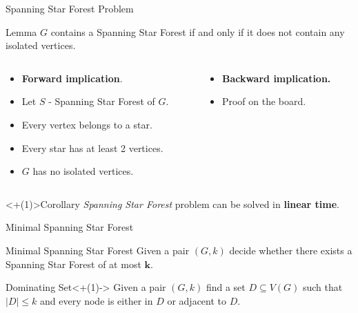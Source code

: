 \documentclass{beamer}
\begin{document}
\begin{frame}[t]{Spanning Star Forest Problem}
	\begin{block}{Lemma }
		$G$ contains a Spanning Star Forest if and only if it does not contain any isolated vertices.
	\end{block}
	
	\setlength{\leftmargini}{2pt}
	\begin{columns}[t]
		\begin{column}{0.5\textwidth}
			\begin{itemize}[<+(1)->]
				\item[] \textbf{Forward implication}.
				\item[] Let $S$ - Spanning Star Forest of $G$.
				\item[] Every vertex belongs to a star.
				\item[] Every star has at least 2 vertices.
				\item[] $G$ has no isolated vertices.
			\end{itemize}
		\end{column}
		\begin{column}{0.5\textwidth}
			\begin{itemize}[<+(1)->]
				\item[] \textbf{Backward implication.}
				\item[] Proof on the board.
			\end{itemize}
		\end{column}
	\end{columns}
	
	\vfill
	
	\begin{block}<+(1)>{Corollary}
		\emph{Spanning Star Forest} problem can be solved in \textbf{linear time}.
	\end{block}
	
\end{frame}

\begin{frame}[t]{Minimal Spanning Star Forest}

\begin{block}{Minimal Spanning Star Forest}
	Given a pair $(G,k)$ decide whether there exists a Spanning Star Forest of at most $\mathbf{k}$.
\end{block}

\bigskip

\begin{block}{Dominating Set}<+(1)->
	Given a pair $(G,k)$ find a set $D \subseteq V(G)$ such that $|D| \leq k$ and every node is either in $D$ or adjacent to $D$.
\end{block}

\end{frame}
\end{document}
